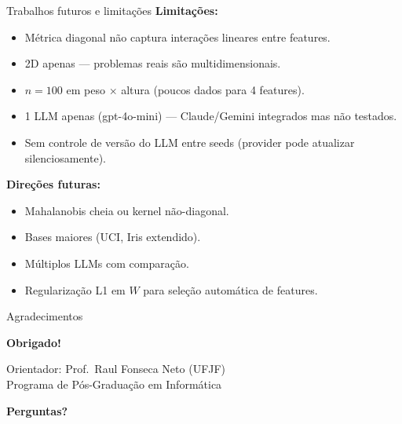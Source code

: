 \documentclass[aspectratio=169,10pt]{beamer}
\begin{document}
\begin{frame}{Trabalhos futuros e limita\c{c}\~oes}
  \footnotesize
  \textbf{Limita\c{c}\~oes:}
  \begin{itemize}\setlength\itemsep{0.05em}
    \item M\'etrica diagonal n\~ao captura intera\c{c}\~oes lineares entre features.
    \item 2D apenas --- problemas reais s\~ao multidimensionais.
    \item $n=100$ em peso $\times$ altura (poucos dados para 4 features).
    \item 1 LLM apenas (gpt-4o-mini) --- Claude/Gemini integrados mas n\~ao testados.
    \item Sem controle de vers\~ao do LLM entre seeds (provider pode atualizar silenciosamente).
  \end{itemize}
  \medskip
  \textbf{Dire\c{c}\~oes futuras:}
  \begin{itemize}\setlength\itemsep{0.05em}
    \item Mahalanobis cheia ou kernel n\~ao-diagonal.
    \item Bases maiores (UCI, Iris extendido).
    \item M\'ultiplos LLMs com compara\c{c}\~ao.
    \item Regulariza\c{c}\~ao L1 em $W$ para sele\c{c}\~ao autom\'atica de features.
  \end{itemize}
\end{frame}

\begin{frame}{Agradecimentos}
  \footnotesize
  \begin{center}
    \Large \textbf{Obrigado!}
    \medskip

    \normalsize
    Orientador: Prof.\ Raul Fonseca Neto (UFJF)\\
    Programa de P\'os-Gradua\c{c}\~ao em Inform\'atica
    \medskip

    \large \textbf{Perguntas?}
  \end{center}
\end{frame}

\end{document}
